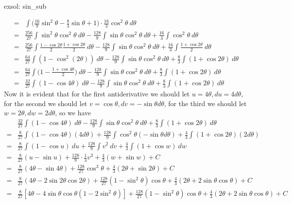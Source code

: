 \begin{exsol}[]{exsol: sin_sub}
\begin{enumerate}[a)]
\begin{align*}
            =&\int \Big(\frac{16}{9}\sin^2\theta-\frac{8}{3}\sin\theta + 1 \Big) \cdot \frac{16}{3} \cos^2 \theta~d\theta\\
            =&\frac{256}{27}\int \sin^2\theta \cos^2\theta~d\theta - \frac{128}{9}\int \sin\theta \cos^2\theta~d\theta + \frac{16}{3}\int \cos^2\theta~d\theta\\
            =&\frac{256}{27}\int \frac{1-\cos 2\theta}{2}\frac{1+\cos 2\theta}{2}~d\theta - \frac{128}{9}\int \sin \theta \cos^2\theta~d\theta + \frac{16}{3}\int \frac{1+\cos 2\theta}{2}~d\theta\\
            =&\frac{64}{27}\int (1-\cos^2(2\theta))~d\theta - \frac{128}{9}\int \sin \theta \cos^2\theta~d\theta + \frac{8}{3}\int (1+\cos 2\theta)~d\theta\\
            =&\frac{64}{27}\int \Big(1-\frac{1+\cos 4\theta}{2}\Big)~d\theta - \frac{128}{9}\int \sin \theta \cos^2\theta~d\theta + \frac{8}{3}\int (1+\cos 2\theta)~d\theta\\
            =&\frac{32}{27}\int (1-\cos 4\theta)~d\theta - \frac{128}{9}\int \sin \theta \cos^2\theta~d\theta + \frac{8}{3}\int (1+\cos 2\theta)~d\theta
        \end{align*}
        Now it is evident that for the first antiderivative we should let $u = 4\theta, du = 4d\theta$, for the second we should let $v = \cos\theta, dv = -\sin\theta d\theta$, for the third we should let $w = 2\theta, dw = 2d\theta$, so we have
        \begin{align*}
            &\frac{32}{27}\int (1-\cos 4\theta)~d\theta - \frac{128}{9}\int \sin \theta \cos^2\theta~d\theta + \frac{8}{3}\int (1+\cos 2\theta)~d\theta\\
            =&\frac{8}{27}\int (1-\cos 4\theta)(4d\theta) + \frac{128}{9}\int \cos^2\theta(-\sin \theta d\theta) + \frac{4}{3}\int (1+\cos 2\theta)(2d\theta)\\
            =&\frac{8}{27}\int (1-\cos u)~du + \frac{128}{9}\int v^2~dv + \frac{4}{3}\int (1+\cos w)~dw\\
            =&\frac{8}{27}(u - \sin u) + \frac{128}{9}\cdot\frac{1}{3} v^3 + \frac{4}{3}(w + \sin w) + C\\
            =&\frac{8}{27}(4\theta - \sin 4\theta) + \frac{128}{27} \cos^3\theta + \frac{4}{3}(2\theta + \sin 2\theta) + C\\
            =&\frac{8}{27}(4\theta - 2\sin 2\theta \cos 2\theta) + \frac{128}{27} (1-\sin^2\theta)\cos\theta + \frac{4}{3}(2\theta + 2\sin \theta \cos \theta) + C\\
            =&\frac{8}{27}[4\theta - 4\sin \theta \cos \theta (1-2\sin^2\theta)] + \frac{128}{27} (1-\sin^2\theta)\cos\theta + \frac{4}{3}(2\theta + 2\sin \theta \cos \theta) + C\\

\end{align*}
\end{enumerate}
\end{exsol}
